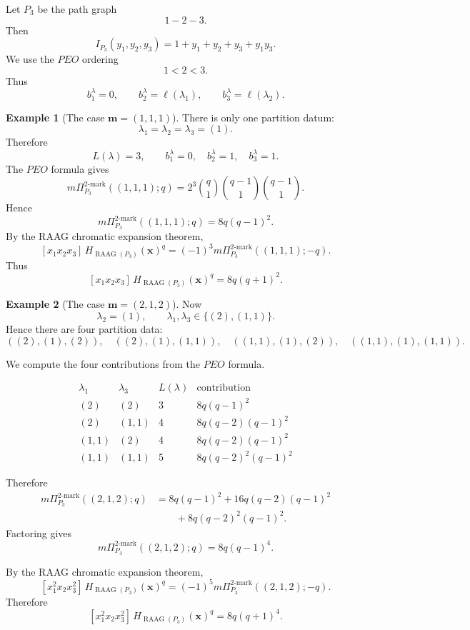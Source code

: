 \documentclass[11pt,reqno]{amsart}
\numberwithin{equation}{section} %
\theoremstyle{definition}
\newtheorem{example}{Example}
\theoremstyle{remark}
\newcommand{\RAAG}{\operatorname{RAAG}}
\numberwithin{equation}{section}
\begin{document}
Let \(P_3\) be the path graph
\[
1-2-3.
\]
Then
\[
I_{P_3}(y_1,y_2,y_3)=1+y_1+y_2+y_3+y_1y_3.
\]
We use the $PEO$ ordering
\[
1<2<3.
\]
Thus
\[
b_1^\lambda=0,\qquad
b_2^\lambda=\ell(\lambda_1),\qquad
b_3^\lambda=\ell(\lambda_2).
\]

\begin{example}[The case \(\mathbf m=(1,1,1)\)]
There is only one partition datum:
\[
\lambda_1=\lambda_2=\lambda_3=(1).
\]
Therefore
\[
L(\lambda)=3,
\qquad
b_1^\lambda=0,\quad b_2^\lambda=1,\quad b_3^\lambda=1.
\]
The $PEO$ formula gives
\[
m\Pi_{P_3}^{2\text{-mark}}((1,1,1);q)
=
2^3
\binom q1
\binom{q-1}{1}
\binom{q-1}{1}.
\]
Hence
\[
m\Pi_{P_3}^{2\text{-mark}}((1,1,1);q)
=
8q(q-1)^2.
\]
By the RAAG chromatic expansion theorem,
\[
[x_1x_2x_3]\,H_{\RAAG(P_3)}(\mathbf x)^q
=
(-1)^3
m\Pi_{P_3}^{2\text{-mark}}((1,1,1);-q).
\]
Thus
\[
[x_1x_2x_3]\,H_{\RAAG(P_3)}(\mathbf x)^q
=
8q(q+1)^2.
\]
\end{example}

\begin{example}[The case \(\mathbf m=(2,1,2)\)]
Now
\[
\lambda_2=(1),
\qquad
\lambda_1,\lambda_3\in\{(2),(1,1)\}.
\]
Hence there are four partition data:
\[
((2),(1),(2)),
\quad
((2),(1),(1,1)),
\quad
((1,1),(1),(2)),
\quad
((1,1),(1),(1,1)).
\]

We compute the four contributions from the $PEO$ formula.

\[
\begin{array}{c|c|c|c}
\lambda_1 & \lambda_3 & L(\lambda) & \text{contribution} \\
\hline
(2) & (2) & 3 & 8q(q-1)^2 \\
(2) & (1,1) & 4 & 8q(q-2)(q-1)^2 \\
(1,1) & (2) & 4 & 8q(q-2)(q-1)^2 \\
(1,1) & (1,1) & 5 & 8q(q-2)^2(q-1)^2
\end{array}
\]

Therefore
\[
\begin{aligned}
m\Pi_{P_3}^{2\text{-mark}}((2,1,2);q)
&=
8q(q-1)^2
+16q(q-2)(q-1)^2 \\
&\qquad
+8q(q-2)^2(q-1)^2.
\end{aligned}
\]
Factoring gives
\[
\boxed{
m\Pi_{P_3}^{2\text{-mark}}((2,1,2);q)
=
8q(q-1)^4.
}
\]

By the RAAG chromatic expansion theorem,
\[
[x_1^2x_2x_3^2]\,H_{\RAAG(P_3)}(\mathbf x)^q
=
(-1)^5
m\Pi_{P_3}^{2\text{-mark}}((2,1,2);-q).
\]
Therefore
\[
\boxed{
[x_1^2x_2x_3^2]\,H_{\RAAG(P_3)}(\mathbf x)^q
=
8q(q+1)^4.
}
\]
\end{example}
\fi
\end{document}
